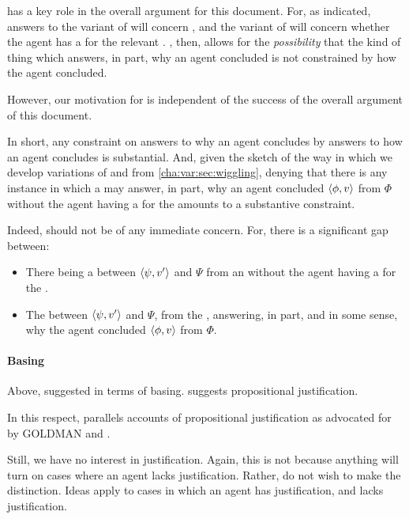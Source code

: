 \begin{note}
  \supportII{} has a key role in the overall argument for this document.
  For, as indicated, answers to the variant of \qWhy{} will concern \ros{}, and the variant of \qHow{} will concern whether the agent has a \wit{} for the relevant \ros{}.
  \supportII{}, then, allows for the \emph{possibility} that the kind of thing which answers, in part, why an agent concluded is not constrained by how the agent concluded.

  However, our motivation for \supportII{} is independent of the success of the overall argument of this document.

  In short, any constraint on answers to why an agent concludes by answers to how an agent concludes is substantial.
  And, given the sketch of the way in which we develop variations of \qWhy{} and \qHow{} from \autoref{cha:var:sec:wiggling}, denying that there is any instance in which a \ros{} may answer, in part, why an agent concluded \(\langle \phi, v \rangle\) from \(\Phi\) without the agent having a \wit{} for the \ros{} amounts to a substantive constraint.

  Indeed, \supportII{} should not be of any immediate concern.
  For, there is a significant gap between:

  \begin{itemize}[noitemsep]
  \item
    There being a \ros{} between \(\langle \psi, v' \rangle\) and \(\Psi\) from an \agpe{} without the agent having a \wit{} for the \ros{}.
  \item
    The \ros{} between \(\langle \psi, v' \rangle\) and \(\Psi\), from the \agpe{}, answering, in part, and in some sense, why the agent concluded \(\langle \phi, v \rangle\) from \(\Phi\).
  \end{itemize}
\end{note}

\paragraph{Basing}

\begin{note}
  Above, suggested \supportI{} in terms of basing.
  \supportII{} suggests propositional justification.

  In this respect, \supportII{} parallels accounts of propositional justification as advocated for by GOLDMAN and \citeauthor{Turri:2010aa}.

  Still, we have no interest in justification.
  Again, this is not because anything will turn on cases where an agent lacks justification.
  Rather, do not wish to make the distinction.
  Ideas apply to cases in which an agent has justification, and lacks justification.
\end{note}


